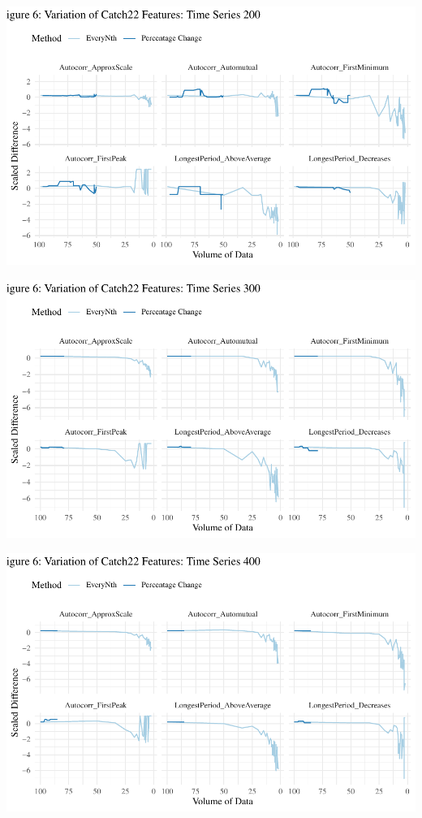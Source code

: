 \documentclass{article}
\begin{document}
\includegraphics{210431461_CSC8639_Dissertation_files/figure-latex/Catch22Variation200-1.pdf}

\includegraphics{210431461_CSC8639_Dissertation_files/figure-latex/Catch22Variation300-1.pdf}

\includegraphics{210431461_CSC8639_Dissertation_files/figure-latex/Catch22Variation400-1.pdf}
\end{document}
